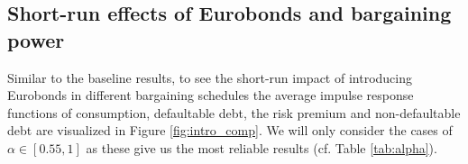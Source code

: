 \subsection{Short-run effects of Eurobonds and bargaining power}
Similar to the baseline results, to see the short-run impact of introducing Eurobonds in different bargaining schedules the average impulse response functions of consumption, defaultable debt, the risk premium and non-defaultable debt are visualized in Figure \ref{fig:intro_comp}. We will only consider the cases of $\alpha \in [0.55,1]$ as these give us the most reliable results (cf. Table \ref{tab:alpha}).\\
\begin{table}[H]\Large
\setlength{\arrayrulewidth}{0.3mm}
\centering
    \caption{\textbf{Model statistics for different distributions of bargaining power $\alpha$}}
    \label{tab:alpha}
    \vspace{1mm}
\end{table}
